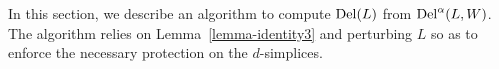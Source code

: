 \documentclass[11pt,a4paper]{article}
\newcommand{\str}{{\rm star}}
\newcommand{\del}{{\rm Del}}
\newcommand{\wit}{{\rm Wit}}
\begin{document}
In this section, we describe an algorithm to compute $\del (L)$ from
$\del^{\alpha} (L,W)$. The algorithm relies on Lemma~\ref{lemma-identity3} and  perturbing
$L$ so as to enforce the necessary protection on the $d$-simplices.




\newpage
\end{document}
